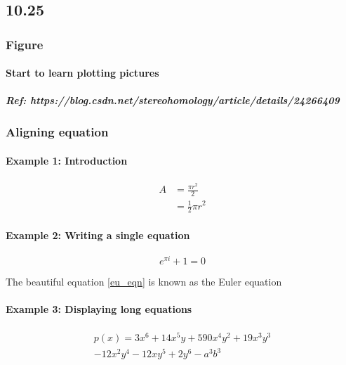 \documentclass[10pt,a4paper]{article}
\begin{document}
\subsection{10.25}
\subsubsection{Figure}
\paragraph{Start to learn plotting pictures}
\subparagraph{Ref: https://blog.csdn.net/stereohomology/article/details/24266409}
\hskip 5pt
\subsubsection{Aligning equation}
\paragraph{Example 1: Introduction}
\begin{equation} \label{eq1}
\begin{split}
A & = \frac{\pi r^2}{2} \\
 & = \frac{1}{2} \pi r^2
\end{split}
\end{equation}
\paragraph{Example 2: Writing a single equation}
\begin{equation} \label{eu_eqn}
e^{\pi i} + 1 = 0
\end{equation}
 
The beautiful equation \ref{eu_eqn} is known as the Euler equation

\paragraph{Example 3: Displaying long equations}
\begin{multline*}
p(x) = 3x^6 + 14x^5y + 590x^4y^2 + 19x^3y^3\\ 
- 12x^2y^4 - 12xy^5 + 2y^6 - a^3b^3
\end{multline*}
\end{document}
